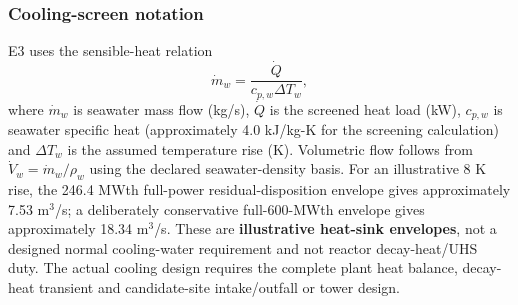 \subsubsection{Cooling-screen notation}
E3 uses the sensible-heat relation
\[
\dot m_w=\frac{\dot Q}{c_{p,w}\Delta T_w},
\]
where $\dot m_w$ is seawater mass flow (kg/s), $\dot Q$ is the screened heat load (kW), $c_{p,w}$ is seawater specific heat (approximately 4.0 kJ/kg-K for the screening calculation) and $\Delta T_w$ is the assumed temperature rise (K). Volumetric flow follows from $\dot V_w=\dot m_w/\rho_w$ using the declared seawater-density basis. For an illustrative 8 K rise, the 246.4 MWth full-power residual-disposition envelope gives approximately 7.53 m$^3$/s; a deliberately conservative full-600-MWth envelope gives approximately 18.34 m$^3$/s. These are \textbf{illustrative heat-sink envelopes}, not a designed normal cooling-water requirement and not reactor decay-heat/UHS duty. The actual cooling design requires the complete plant heat balance, decay-heat transient and candidate-site intake/outfall or tower design.
